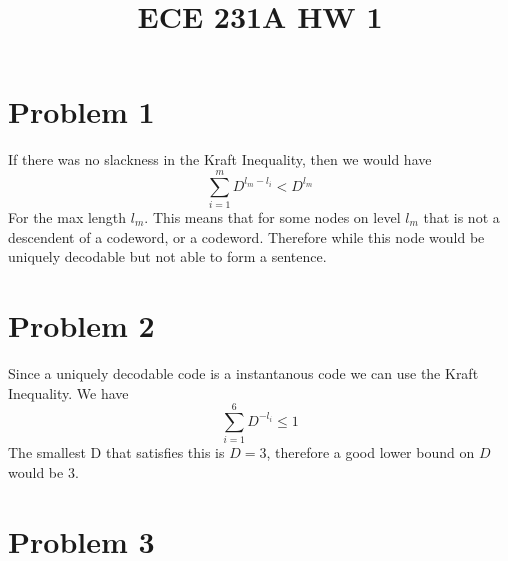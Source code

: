 
\title{ECE 231A HW 1}

\maketitle
\section*{Problem 1}
If there was no slackness in the Kraft Inequality, then we would have 
$$\sum_{i=1}^m D^{l_m-l_i}<D^{l_m}$$
For the max length $l_m$. This means that for some nodes on level $l_m$ that is not a descendent of a codeword, or a codeword. Therefore while this node would be uniquely decodable but not able to form a sentence.
\section*{Problem 2}
Since a uniquely decodable code is a instantanous code we can use 
the Kraft Inequality. We have
$$\sum_{i=1}^{6}D^{-l_i}\leq1$$
The smallest D that satisfies this is $D=3$, therefore a good
lower bound on $D$ would be $\boxed{3}$.
\section*{Problem 3}
